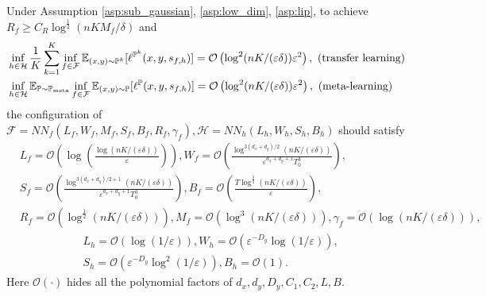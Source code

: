 \documentclass[11pt]{article}
\numberwithin{equation}{section}
\newcommand{\Pmeta}{\mathbb{P}_{\text{meta}}}
\renewcommand{\P}{\mathbb{P}}
\begin{document}
\begin{thm}
\label{thm:approximation_all}
    Under Assumption \ref{asp:sub_gaussian}, \ref{asp:low_dim}, \ref{asp:lip}, to achieve $R_f\geq C_R\log^{\frac{1}{2}}(nKM_f/\delta)$ and
    \begin{align}
        &\inf_{h\in\mathcal{H}} \frac{1}{K}\sum_{k=1}^K \inf_{f\in\mathcal{F}}\E_{(x,y)\sim\P^k} [\ell^{\P^k} (x,y,s_{f,h})] = \mathcal{O}\left(\log^2(nK/(\varepsilon\delta))\varepsilon^2\right), \text{ (transfer learning)} \\
        &\inf_{h\in\mathcal{H}}\E_{\P\sim\Pmeta}\inf_{f\in\mathcal{F}}\E_{(x,y)\sim\P} [\ell^\P(x,y,s_{f,h})] = \mathcal{O}\left(\log^2(nK/(\varepsilon\delta))\varepsilon^2\right), \text{ (meta-learning)}
    \end{align}
    the configuration of $\mathcal{F}=NN_f(L_f,W_f,M_f,S_f,B_f,R_f,\gamma_f),\mathcal{H}=NN_h(L_h,W_h,S_h,B_h)$ should satisfy
    \begin{equation}
        \begin{aligned}
            &L_f=\mathcal{O}\left(\log\left(\frac{\log(nK/(\varepsilon\delta))}{\varepsilon}\right)\right),
            W_f=\mathcal{O}\left(\frac{\log^{3(d_x+d_y)/2}(nK/(\varepsilon\delta))}{\varepsilon^{d_x+d_y+1}T_0^3}\right), \\
            &S_f=\mathcal{O}\left(\frac{\log^{3(d_x+d_y)/2+1}(nK/(\varepsilon\delta))}{\varepsilon^{d_x+d_y+1}T_0^3}\right),
            B_f=\mathcal{O}\left(\frac{T\log^{\frac{3}{2}}(nK/(\varepsilon\delta))}{\varepsilon}\right), \\
            &R_f=\mathcal{O}\left(\log^{\frac{1}{2}}(nK/(\varepsilon\delta))\right), 
            M_f=\mathcal{O}\left(\log^3(nK/(\varepsilon\delta))\right),
            \gamma_f=\mathcal{O}\left(\log(nK/(\varepsilon\delta))\right),
        \end{aligned}
    \end{equation}
     \begin{equation}
        \begin{aligned}
            &L_h=\mathcal{O}\left(\log(1/\varepsilon)\right), W_h=\mathcal{O}\left(\varepsilon^{-D_y}\log(1/\varepsilon)\right), \\
            &S_h=\mathcal{O}\left(\varepsilon^{-D_y}\log^2(1/\varepsilon)\right),
            B_h = \mathcal{O}(1).
        \end{aligned}
    \end{equation}
    Here $\mathcal{O}(\cdot)$ hides all the polynomial factors of $d_x,d_y,D_y,C_1,C_2,L,B$.
\end{thm}
\end{document}
